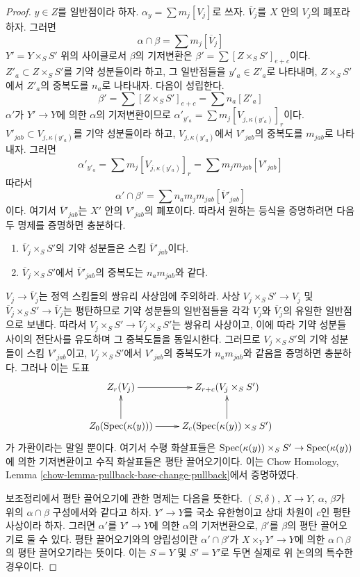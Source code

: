 \begin{proof}
\medskip\noindent
$y \in Z$를 일반점이라 하자. $\alpha_y = \sum m_j [V_j]$로 쓰자.
$\overline{V}_j$를 $X$ 안의 $V_j$의 폐포라 하자. 그러면
$$
\alpha \cap \beta = \sum m_j[\overline{V}_j]
$$
$Y' = Y \times_S S'$ 위의 사이클로서 $\beta$의 기저변환은
$\beta' = \sum [Z \times_S S']_{e + c}$이다.
$Z'_a \subset Z \times_S S'$를 기약 성분들이라 하고, 그 일반점들을
$y'_a \in Z'_a$로 나타내며, $Z \times_S S'$에서 $Z'_a$의 중복도를
$n_a$로 나타내자. 다음이 성립한다.
$$
\beta' = \sum [Z \times_S S']_{e + c} = \sum n_a[Z'_a]
$$
$\alpha'$가 $Y' \to Y$에 의한 $\alpha$의 기저변환이므로
$\alpha'_{y'_a} = \sum m_j [V_{j, \kappa(y'_a)}]_r$이다.
$V'_{jab} \subset V_{j, \kappa(y'_a)}$를 기약 성분들이라 하고,
$V_{j, \kappa(y'_a)}$에서 $V'_{jab}$의 중복도를 $m_{jab}$로 나타내자.
그러면
$$
\alpha'_{y'_a} = \sum m_j [V_{j, \kappa(y'_a)}]_r =
\sum m_j m_{jab} [V'_{jab}]
$$
따라서
$$
\alpha' \cap \beta' = \sum n_a m_j m_{jab} [\overline{V}'_{jab}]
$$
이다. 여기서 $\overline{V}'_{jab}$는 $X'$ 안의 $V'_{jab}$의 폐포이다.
따라서 원하는 등식을 증명하려면 다음 두 명제를 증명하면 충분하다.
\begin{enumerate}
\item $\overline{V}_j \times_S S'$의 기약 성분들은 스킴
$\overline{V}'_{jab}$이다.
\item $\overline{V}_j \times_S S'$에서 $\overline{V}'_{jab}$의
중복도는 $n_a m_{jab}$와 같다.
\end{enumerate}
$V_j \to \overline{V}_j$는 정역 스킴들의 쌍유리 사상임에 주의하라.
사상 $V_j \times_S S' \to V_j$ 및
$\overline{V}_j \times_S S' \to \overline{V}_j$는 평탄하므로 기약
성분들의 일반점들을 각각 $V_j$와 $\overline{V}_j$의 유일한 일반점으로
보낸다. 따라서 $V_j \times_S S' \to \overline{V}_j \times_S S'$는
쌍유리 사상이고, 이에 따라 기약 성분들 사이의 전단사를 유도하며
그 중복도들을 동일시한다. 그러므로 $V_j \times_S S'$의 기약 성분들이
스킴 $V'_{jab}$이고, $V_j \times_S S'$에서 $V'_{jab}$의 중복도가
$n_a m_{jab}$와 같음을 증명하면 충분하다. 그러나 이는 도표
$$
\xymatrix{
Z_r(V_j) \ar[r] & Z_{r + c}(V_j \times_S S') \\
Z_0(\Spec(\kappa(y))) \ar[r] \ar[u] &
Z_c(\Spec(\kappa(y)) \times_S S') \ar[u]
}
$$
가 가환이라는 말일 뿐이다. 여기서 수평 화살표들은
$\mathop{\mathrm{Spec}}(\kappa(y)) \times_S S' \to \mathop{\mathrm{Spec}}(\kappa(y))$에 의한
기저변환이고 수직 화살표들은 평탄 끌어오기이다. 이는 Chow Homology,
Lemma \ref{chow-lemma-pullback-base-change-pullback}에서 증명하였다.

\medskip\noindent
보조정리에서 평탄 끌어오기에 관한 명제는 다음을 뜻한다.
$(S, \delta)$, $X \to Y$, $\alpha$, $\beta$가 위의
$\alpha \cap \beta$ 구성에서와 같다고 하자. $Y' \to Y$를 국소
유한형이고 상대 차원이 $c$인 평탄 사상이라 하자. 그러면 $\alpha'$를
$Y' \to Y$에 의한 $\alpha$의 기저변환으로, $\beta'$를 $\beta$의
평탄 끌어오기로 둘 수 있다. 평탄 끌어오기와의 양립성이란
$\alpha' \cap \beta'$가
$X \times_Y Y' \to Y$에 의한 $\alpha \cap \beta$의 평탄
끌어오기라는 뜻이다. 이는 $S = Y$ 및 $S' = Y'$로 두면 실제로 위
논의의 특수한 경우이다.
\end{proof}

